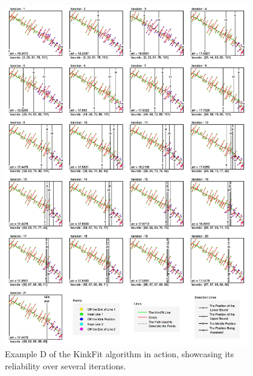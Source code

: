 

\begin{figure}[h!]
  \centering
    \includegraphics[width=0.95\textwidth]{Chapter4/Figs/KinkFit_K.jpg}
    \caption{Example D of the KinkFit algorithm in action, showcasing its reliability over several iterations.}\label{fig:KinkFitK}
\end{figure}



